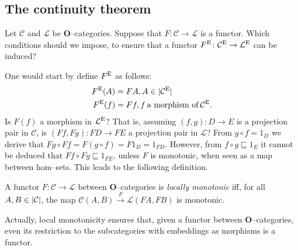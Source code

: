 \subsection{The continuity theorem}

Let \(\mathcal{C}\) and \(\mathcal{L}\) be \(\mathbf{O}\)--categories. Suppose that \(F \colon \mathcal{C} \to \mathcal{L}\) is a functor.
Which conditions should we impose, to ensure that a functor \(F^\textup{E} \colon \mathcal{C}^\textup{E} \to \mathcal{L}^\textup{E}\) can be induced?

One would start by define \(F^\textup{E}\) as follows:
\begin{align*}
  F^\textup{E}(A) &= FA, A \in \lvert \mathcal{C}^\textup{E} \rvert \\
  F^\textup{E}(f) &= Ff, f\:\text{a morphism of}\:\mathcal{C}^\textup{E}.
\end{align*}
Is \(F(f)\) a morphism in \(\mathcal{L}^\textup{E}\)?
That is, assuming \((f,g) \colon D \to E\) is a projection pair in \(\mathcal{C}\), is \((Ff,Fg) \colon FD \to FE\) a projection pair in \(\mathcal{L}\)?
From \(g \circ f = 1_D\) we derive that \(Fg \circ Ff = F(g \circ f) = F1_D = 1_{FD}\).
However, from \(f \circ g \sqsubseteq 1_E\) it cannot be deduced that \(Ff \circ Fg \sqsubseteq 1_{FE}\), unless \(F\) is monotonic, when seen as a map between hom--sets. This leads to the following definition.

\begin{dfn}
  A functor \(F \colon \mathcal{C} \to \mathcal{L}\) between \(\mathbf{O}\)--categories is \emph{locally monotonic} iff, for all \(A, B \in \lvert \mathcal{C} \rvert\), the map \(\mathcal{C}(A,B) \overset{F}{\to}\mathcal{L}(FA,FB)\) is monotonic.
\end{dfn}

Actually, local monotonicity ensures that, given a functor between \(\mathbf{O}\)--categories, even its restriction to the subcategories with embeddings as morphisms is a functor.


